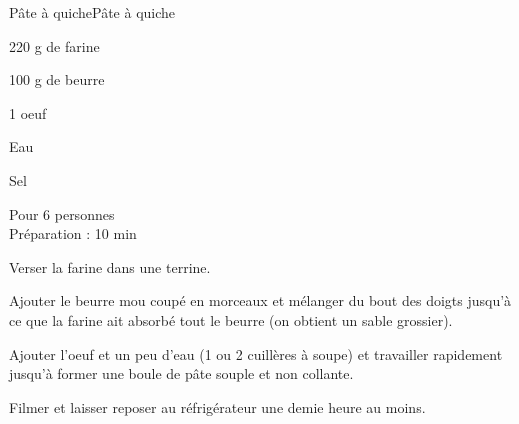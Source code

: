 \begin{recette}{Pâte à quiche}{Pâte à quiche}

\begin{ingredients}
220 g de farine\par
100 g de beurre\par
1 oeuf\par
Eau\par
Sel\par
\end{ingredients}

\begin{infos}
Pour 6 personnes\\
Préparation : 10 min\\
\end{infos}

\begin{etapes}
\item Verser la farine dans une terrine.
\item Ajouter le beurre mou coupé en morceaux et mélanger du bout des doigts jusqu'à ce que la farine ait absorbé tout le beurre (on obtient un sable grossier).
\item Ajouter l'oeuf et un peu d'eau (1 ou 2 cuillères à soupe) et travailler rapidement jusqu'à former une boule de pâte souple et non collante.
\item Filmer et laisser reposer au réfrigérateur une demie heure au moins.
\end{etapes}

\end{recette}